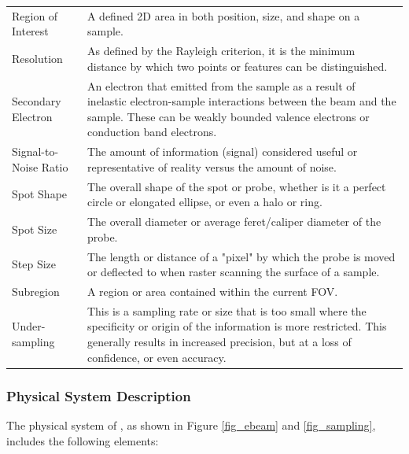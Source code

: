 \documentclass[12pt]{article}
\begin{document}
\begin{center}
\begin{longtable}{p{4.25cm} p{11.25cm}}
        Region of Interest & A defined 2D area in both position, size, and shape on a sample. \\
        
        Resolution & As defined by the Rayleigh criterion, it is the minimum distance by which two points or features can be distinguished. \\
        
        Secondary Electron & An electron that emitted from the sample as a result of inelastic electron-sample interactions between the beam and the sample. These can be weakly bounded valence electrons or conduction band electrons. \\
        
        Signal-to-Noise Ratio & The amount of information (signal) considered useful or representative of reality versus the amount of noise. \\
        
        Spot Shape & The overall shape of the spot or probe, whether is it a perfect circle or elongated ellipse, or even a halo or ring. \\
        
        Spot Size & The overall diameter or average feret/caliper diameter of the probe. \\
        
        Step Size & The length or distance of a "pixel" by which the probe is moved or deflected to when raster scanning the surface of a sample. \\
        
        Subregion & A region or area contained within the current FOV. \\

        Under-sampling & This is a sampling rate or size that is too small where the specificity or origin of the information is more restricted. This generally results in increased precision, but at a loss of confidence, or even accuracy. \\
        \bottomrule
    \end{longtable} 
\end{center}

\subsubsection{Physical System Description} \label{sec_phySystDescrip}

The physical system of \progname{}, as shown in Figure \ref{fig_ebeam} and \ref{fig_sampling},
includes the following elements:
\end{document}
